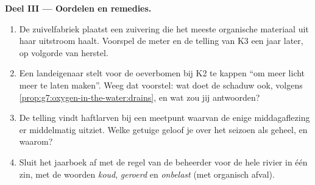 \begin{problem}
\medskip\noindent\textbf{Deel III --- Oordelen en
remedies.}
\begin{enumerate}[resume]
  \item De zuivelfabriek plaatst een zuivering die het meeste organische
        materiaal uit haar uitstroom haalt. Voorspel de meter en de
        telling van K3 een jaar later, op volgorde van herstel.
  \item Een landeigenaar stelt voor de oeverbomen bij K2 te kappen ``om
        meer licht meer  te laten maken''. Weeg dat voorstel: wat
        doet de schaduw ook, volgens
        \cref{prop:g7:oxygen-in-the-water:drains}, en wat zou jij
        antwoorden?
  \item De telling vindt haftlarven bij een meetpunt waarvan de enige
        middagaflezing er middelmatig uitziet. Welke getuige geloof je
        over het seizoen als geheel, en waarom?
  \item Sluit het jaarboek af met de regel van de beheerder voor de hele
        rivier in één zin, met de woorden \emph{koud}, \emph{geroerd} en
        \emph{onbelast} (met organisch afval).
\end{enumerate}
\end{problem}
